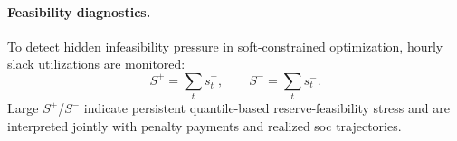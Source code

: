 \paragraph{Feasibility diagnostics.}
To detect hidden infeasibility pressure in soft-constrained optimization, hourly slack utilizations are monitored:
\begin{equation}
    S^{+}=\sum_t s_t^{+},\qquad S^{-}=\sum_t s_t^{-}.
\end{equation}
Large $S^{+}$/$S^{-}$ indicate persistent quantile-based reserve-feasibility stress and are interpreted jointly with penalty payments and realized \gls{soc} trajectories.
